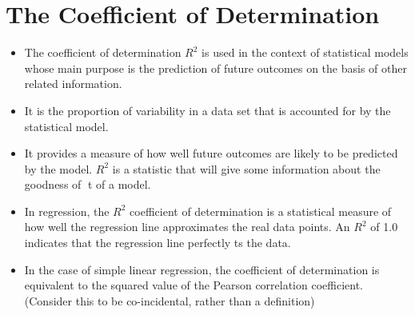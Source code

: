 \documentclass[]{report}
\begin{document}
	
\section*{The Coefficient of Determination}
\begin{itemize}
	\item 

The coefficient of determination $R^2$ is used in the context of statistical models whose main
purpose is the prediction of future outcomes on the basis of other related information. \item It is the
proportion of variability in a data set that is accounted for by the statistical model. \item It provides
a measure of how well future outcomes are likely to be predicted by the model.
$R^2$ is a statistic that will give some information about the goodness of t of a model.
\item  In
regression, the $R^2$ coefficient of determination is a statistical measure of how well the regression
line approximates the real data points. An $R^2$ of 1.0 indicates that the regression line perfectly
ts the data.
\item In the case of simple linear regression, the coefficient of determination is equivalent to the
squared value of the Pearson correlation coefficient. (Consider this to be co-incidental, rather
than a definition)
\end{itemize}
\end{document}
